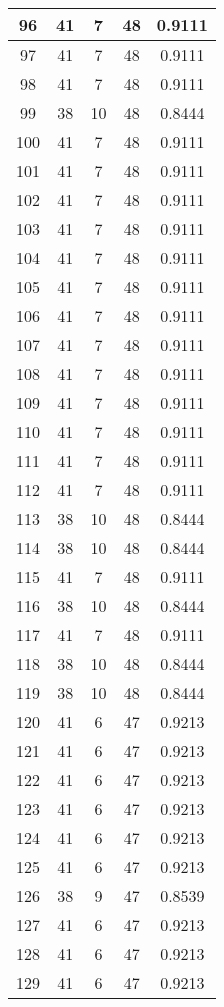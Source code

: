 \documentclass[letterpaper, 12pt]{article}
\begin{document}
\begin{longtable}{|c|c|c|c|c|}
96 & 41 & 7 & 48 & 0.9111 \\
\hline
97 & 41 & 7 & 48 & 0.9111 \\
\hline
98 & 41 & 7 & 48 & 0.9111 \\
\hline
99 & 38 & 10 & 48 & 0.8444 \\
\hline
100 & 41 & 7 & 48 & 0.9111 \\
\hline
101 & 41 & 7 & 48 & 0.9111 \\
\hline
102 & 41 & 7 & 48 & 0.9111 \\
\hline
103 & 41 & 7 & 48 & 0.9111 \\
\hline
104 & 41 & 7 & 48 & 0.9111 \\
\hline
105 & 41 & 7 & 48 & 0.9111 \\
\hline
106 & 41 & 7 & 48 & 0.9111 \\
\hline
107 & 41 & 7 & 48 & 0.9111 \\
\hline
108 & 41 & 7 & 48 & 0.9111 \\
\hline
109 & 41 & 7 & 48 & 0.9111 \\
\hline
110 & 41 & 7 & 48 & 0.9111 \\
\hline
111 & 41 & 7 & 48 & 0.9111 \\
\hline
112 & 41 & 7 & 48 & 0.9111 \\
\hline
113 & 38 & 10 & 48 & 0.8444 \\
\hline
114 & 38 & 10 & 48 & 0.8444 \\
\hline
115 & 41 & 7 & 48 & 0.9111 \\
\hline
116 & 38 & 10 & 48 & 0.8444 \\
\hline
117 & 41 & 7 & 48 & 0.9111 \\
\hline
118 & 38 & 10 & 48 & 0.8444 \\
\hline
119 & 38 & 10 & 48 & 0.8444 \\
\hline
120 & 41 & 6 & 47 & 0.9213 \\
\hline
121 & 41 & 6 & 47 & 0.9213 \\
\hline
122 & 41 & 6 & 47 & 0.9213 \\
\hline
123 & 41 & 6 & 47 & 0.9213 \\
\hline
124 & 41 & 6 & 47 & 0.9213 \\
\hline
125 & 41 & 6 & 47 & 0.9213 \\
\hline
126 & 38 & 9 & 47 & 0.8539 \\
\hline
127 & 41 & 6 & 47 & 0.9213 \\
\hline
128 & 41 & 6 & 47 & 0.9213 \\
\hline
129 & 41 & 6 & 47 & 0.9213 \\

\end{longtable}
\end{document}

